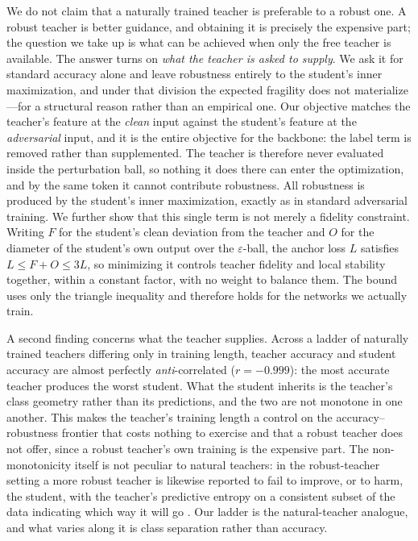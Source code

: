 We do not claim that a naturally trained teacher is preferable to a robust one. A robust teacher is
better guidance, and obtaining it is precisely the expensive part; the question we take up is what can
be achieved when only the free teacher is available. The answer turns on \emph{what the teacher is
asked to supply}. We ask it for standard accuracy alone and leave robustness entirely to the student's
inner maximization, and under that division the expected fragility does not materialize---for a
structural reason rather than an empirical one. Our objective matches the teacher's feature at the
\emph{clean} input against the student's feature at the \emph{adversarial} input, and it is the entire
objective for the backbone: the label term is removed rather than supplemented. The teacher is
therefore never evaluated inside the perturbation ball, so nothing it does there can enter the
optimization, and by the same token it cannot contribute robustness. All robustness is produced by the
student's inner maximization, exactly as in standard adversarial training. We further show that this single term is not merely a fidelity constraint. Writing $F$ for
the student's clean deviation from the teacher and $O$ for the diameter of the student's own output
over the $\varepsilon$-ball, the anchor loss $L$ satisfies $L \le F + O \le 3L$, so minimizing it
controls teacher fidelity and local stability together, within a constant factor, with no weight to
balance them. The bound uses only the triangle inequality and therefore holds for the networks we
actually train.

A second finding concerns what the teacher supplies. Across a ladder of naturally trained teachers
differing only in training length, teacher accuracy and student accuracy are almost perfectly
\emph{anti}-correlated ($r = -0.999$): the most accurate teacher produces the worst student. What the
student inherits is the teacher's class geometry rather than its predictions, and the two are not
monotone in one another. This makes the teacher's training length a control on the
accuracy--robustness frontier that costs nothing to exercise and that a robust teacher does not
offer, since a robust teacher's own training is the expensive part. The non-monotonicity itself is not
peculiar to natural teachers: in the robust-teacher setting a more robust teacher is likewise reported
to fail to improve, or to harm, the student, with the teacher's predictive entropy on a consistent
subset of the data indicating which way it will go \citep{kim2026toward}. Our ladder is the
natural-teacher analogue, and what varies along it is class separation rather than accuracy.

